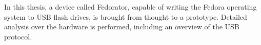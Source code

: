 In this thesis, a device called Fedorator, capable of writing the Fedora operating system to USB flash drives, is brought from thought to a prototype.  Detailed analysis over the hardware is performed, including an overview of the USB protocol.

